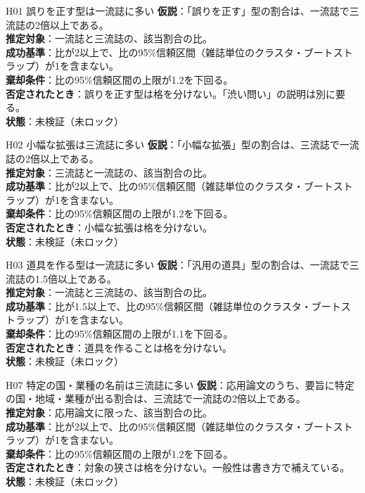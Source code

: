 \documentclass[a4paper,10pt]{ltjsarticle}
\begin{document}
\begin{hypothesis}{H01 誤りを正す型は一流誌に多い}
\textbf{仮説}：「誤りを正す」型の割合は、一流誌で三流誌の2倍以上である。\\
\textbf{推定対象}：一流誌と三流誌の、該当割合の比。\\
\textbf{成功基準}：比が2以上で、比の95\%信頼区間（雑誌単位のクラスタ・ブートストラップ）が1を含まない。\\
\textbf{棄却条件}：比の95\%信頼区間の上限が1.2を下回る。\\
\textbf{否定されたとき}：誤りを正す型は格を分けない。「渋い問い」の説明は別に要る。\\
\textbf{状態}：未検証（未ロック）
\end{hypothesis}

\begin{hypothesis}{H02 小幅な拡張は三流誌に多い}
\textbf{仮説}：「小幅な拡張」型の割合は、三流誌で一流誌の2倍以上である。\\
\textbf{推定対象}：三流誌と一流誌の、該当割合の比。\\
\textbf{成功基準}：比が2以上で、比の95\%信頼区間（雑誌単位のクラスタ・ブートストラップ）が1を含まない。\\
\textbf{棄却条件}：比の95\%信頼区間の上限が1.2を下回る。\\
\textbf{否定されたとき}：小幅な拡張は格を分けない。\\
\textbf{状態}：未検証（未ロック）
\end{hypothesis}

\begin{hypothesis}{H03 道具を作る型は一流誌に多い}
\textbf{仮説}：「汎用の道具」型の割合は、一流誌で三流誌の1.5倍以上である。\\
\textbf{推定対象}：一流誌と三流誌の、該当割合の比。\\
\textbf{成功基準}：比が1.5以上で、比の95\%信頼区間（雑誌単位のクラスタ・ブートストラップ）が1を含まない。\\
\textbf{棄却条件}：比の95\%信頼区間の上限が1.1を下回る。\\
\textbf{否定されたとき}：道具を作ることは格を分けない。\\
\textbf{状態}：未検証（未ロック）
\end{hypothesis}

\begin{hypothesis}{H07 特定の国・業種の名前は三流誌に多い}
\textbf{仮説}：応用論文のうち、要旨に特定の国・地域・業種が出る割合は、三流誌で一流誌の2倍以上である。\\
\textbf{推定対象}：応用論文に限った、該当割合の比。\\
\textbf{成功基準}：比が2以上で、比の95\%信頼区間（雑誌単位のクラスタ・ブートストラップ）が1を含まない。\\
\textbf{棄却条件}：比の95\%信頼区間の上限が1.2を下回る。\\
\textbf{否定されたとき}：対象の狭さは格を分けない。一般性は書き方で補えている。\\
\textbf{状態}：未検証（未ロック）
\end{hypothesis}
\end{document}
